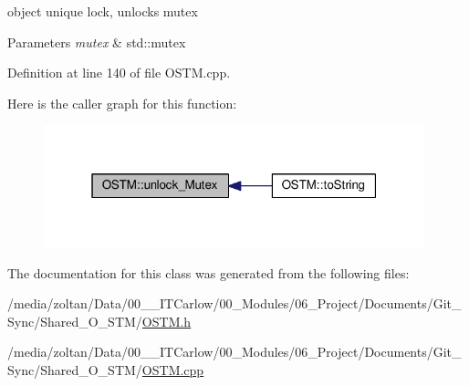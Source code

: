 object unique lock, unlocks mutex 


\begin{DoxyParams}{Parameters}
{\em mutex} & std\+::mutex \\
\hline
\end{DoxyParams}


Definition at line 140 of file O\+S\+T\+M.\+cpp.



Here is the caller graph for this function\+:\nopagebreak
\begin{figure}[H]
\begin{center}
\leavevmode
\includegraphics[width=313pt]{class_o_s_t_m_a6cd703bc26c719fd95b4f5362d050762_icgraph}
\end{center}
\end{figure}




The documentation for this class was generated from the following files\+:\begin{DoxyCompactItemize}
\item 
/media/zoltan/\+Data/00\+\_\+\_\+\+I\+T\+Carlow/00\+\_\+\+Modules/06\+\_\+\+Project/\+Documents/\+Git\+\_\+\+Sync/\+Shared\+\_\+\+O\+\_\+\+S\+T\+M/\hyperlink{_o_s_t_m_8h}{O\+S\+T\+M.\+h}\item 
/media/zoltan/\+Data/00\+\_\+\_\+\+I\+T\+Carlow/00\+\_\+\+Modules/06\+\_\+\+Project/\+Documents/\+Git\+\_\+\+Sync/\+Shared\+\_\+\+O\+\_\+\+S\+T\+M/\hyperlink{_o_s_t_m_8cpp}{O\+S\+T\+M.\+cpp}\end{DoxyCompactItemize}
